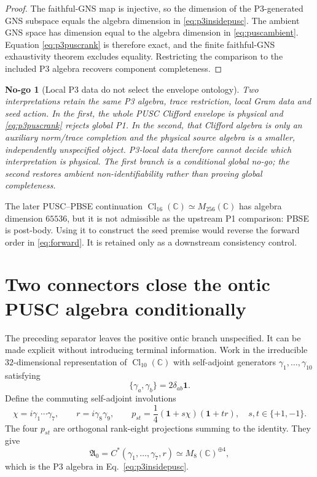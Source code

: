 \documentclass[11pt,a4paper]{article}
\newtheorem{nogo}[definition]{No-go}
\theoremstyle{remark}
\newcommand{\id}{\mathbf 1}
\begin{document}
\begin{proof}
The faithful-GNS map is injective, so the dimension of the P3-generated GNS
subspace equals the algebra dimension in \eqref{eq:p3insidepusc}.  The ambient
GNS space has dimension equal to the algebra dimension in
\eqref{eq:puscambient}.  Equation \eqref{eq:p3puscrank} is therefore exact, and
the finite faithful-GNS exhaustivity theorem excludes equality.  Restricting
the comparison to the included P3 algebra recovers component completeness.
\end{proof}

\begin{nogo}[Local P3 data do not select the envelope ontology]
Two interpretations retain the same P3 algebra, trace restriction, local
Gram data and seed action.  In the first, the whole PUSC Clifford envelope is
physical and \eqref{eq:p3puscrank} rejects global P1.  In the second, that
Clifford algebra is only an auxiliary norm/trace completion and the physical
source algebra is a smaller, independently unspecified object.  P3-local data
therefore cannot decide which interpretation is physical.  The first branch
is a conditional global no-go; the second restores ambient
non-identifiability rather than proving global completeness.
\end{nogo}

The later PUSC--PBSE continuation
$\operatorname{Cl}_{16}(\mathbb C)\simeq M_{256}(\mathbb C)$ has algebra
dimension $65536$, but it is not admissible as the upstream P1 comparison:
PBSE is post-body.  Using it to construct the seed premise would reverse the
forward order in \eqref{eq:forward}.  It is retained only as a downstream
consistency control.

\section{Two connectors close the ontic PUSC algebra conditionally}

The preceding separator leaves the positive ontic branch unspecified.  It
can be made explicit without introducing terminal information.  Work in the
irreducible $32$-dimensional representation of
$\operatorname{Cl}_{10}(\mathbb C)$ with self-adjoint generators
$\gamma_1,\ldots,\gamma_{10}$ satisfying
\begin{equation}
 \{\gamma_a,\gamma_b\}=2\delta_{ab}\id.
 \label{eq:cl10rels}
\end{equation}
Define the commuting self-adjoint involutions
\begin{equation}
 \chi=i\gamma_1\cdots\gamma_7,
 \qquad r=i\gamma_8\gamma_9,
 \qquad
 p_{st}=\frac{1}{4}(\id+s\chi)(\id+tr),
 \quad s,t\in\{+1,-1\}.
 \label{eq:p3blocks}
\end{equation}
The four $p_{st}$ are orthogonal rank-eight projections summing to the
identity.  They give
\begin{equation}
 \mathfrak A_0=C^*(\gamma_1,\ldots,\gamma_7,r)
 \simeq M_8(\mathbb C)^{\oplus4},
 \label{eq:a0fourblocks}
\end{equation}
which is the P3 algebra in Eq.~\eqref{eq:p3insidepusc}.
\end{document}
